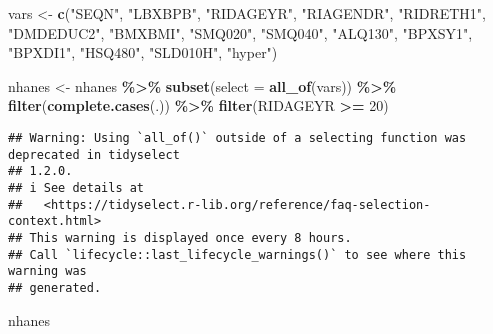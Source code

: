 \documentclass[
]{article}
\newenvironment{Shaded}{\begin{snugshade}}{\end{snugshade}}
\newcommand{\AttributeTok}[1]{\textcolor[rgb]{0.13,0.29,0.53}{#1}}
\newcommand{\DecValTok}[1]{\textcolor[rgb]{0.00,0.00,0.81}{#1}}
\newcommand{\FunctionTok}[1]{\textcolor[rgb]{0.13,0.29,0.53}{\textbf{#1}}}
\newcommand{\NormalTok}[1]{#1}
\newcommand{\OtherTok}[1]{\textcolor[rgb]{0.56,0.35,0.01}{#1}}
\newcommand{\SpecialCharTok}[1]{\textcolor[rgb]{0.81,0.36,0.00}{\textbf{#1}}}
\newcommand{\StringTok}[1]{\textcolor[rgb]{0.31,0.60,0.02}{#1}}
\begin{document}
\begin{Shaded}
\begin{Highlighting}[]
\NormalTok{vars }\OtherTok{\textless{}{-}} \FunctionTok{c}\NormalTok{(}\StringTok{"SEQN"}\NormalTok{, }\StringTok{"LBXBPB"}\NormalTok{, }\StringTok{"RIDAGEYR"}\NormalTok{, }\StringTok{"RIAGENDR"}\NormalTok{, }\StringTok{"RIDRETH1"}\NormalTok{, }\StringTok{"DMDEDUC2"}\NormalTok{, }\StringTok{"BMXBMI"}\NormalTok{, }\StringTok{"SMQ020"}\NormalTok{, }\StringTok{"SMQ040"}\NormalTok{, }\StringTok{"ALQ130"}\NormalTok{, }\StringTok{"BPXSY1"}\NormalTok{, }\StringTok{"BPXDI1"}\NormalTok{, }\StringTok{"HSQ480"}\NormalTok{, }\StringTok{"SLD010H"}\NormalTok{, }\StringTok{"hyper"}\NormalTok{)}

\NormalTok{nhanes }\OtherTok{\textless{}{-}}\NormalTok{ nhanes }\SpecialCharTok{\%\textgreater{}\%} 
  \FunctionTok{subset}\NormalTok{(}\AttributeTok{select =} \FunctionTok{all\_of}\NormalTok{(vars)) }\SpecialCharTok{\%\textgreater{}\%}
  \FunctionTok{filter}\NormalTok{(}\FunctionTok{complete.cases}\NormalTok{(.)) }\SpecialCharTok{\%\textgreater{}\%}
  \FunctionTok{filter}\NormalTok{(RIDAGEYR }\SpecialCharTok{\textgreater{}=} \DecValTok{20}\NormalTok{)}
\end{Highlighting}
\end{Shaded}

\begin{verbatim}
## Warning: Using `all_of()` outside of a selecting function was deprecated in tidyselect
## 1.2.0.
## i See details at
##   <https://tidyselect.r-lib.org/reference/faq-selection-context.html>
## This warning is displayed once every 8 hours.
## Call `lifecycle::last_lifecycle_warnings()` to see where this warning was
## generated.
\end{verbatim}

\begin{Shaded}
\begin{Highlighting}[]
\NormalTok{nhanes}
\end{Highlighting}
\end{Shaded}
\end{document}
